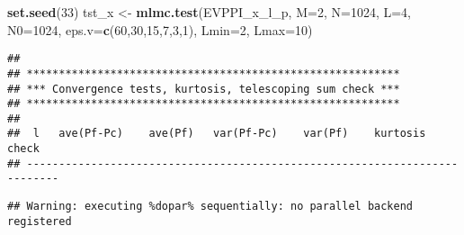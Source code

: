 \documentclass[
]{article}
\newenvironment{Shaded}{\begin{snugshade}}{\end{snugshade}}
\newcommand{\DataTypeTok}[1]{\textcolor[rgb]{0.13,0.29,0.53}{#1}}
\newcommand{\DecValTok}[1]{\textcolor[rgb]{0.00,0.00,0.81}{#1}}
\newcommand{\KeywordTok}[1]{\textcolor[rgb]{0.13,0.29,0.53}{\textbf{#1}}}
\newcommand{\NormalTok}[1]{#1}
\newcommand{\StringTok}[1]{\textcolor[rgb]{0.31,0.60,0.02}{#1}}
\begin{document}
\begin{Shaded}
\begin{Highlighting}[]
\KeywordTok{set.seed}\NormalTok{(}\DecValTok{33}\NormalTok{)}
\NormalTok{tst_x <-}\StringTok{ }\KeywordTok{mlmc.test}\NormalTok{(EVPPI_x_l_p, }\DataTypeTok{M=}\DecValTok{2}\NormalTok{, }\DataTypeTok{N=}\DecValTok{1024}\NormalTok{,}
                          \DataTypeTok{L=}\DecValTok{4}\NormalTok{, }\DataTypeTok{N0=}\DecValTok{1024}\NormalTok{,}
                          \DataTypeTok{eps.v=}\KeywordTok{c}\NormalTok{(}\DecValTok{60}\NormalTok{,}\DecValTok{30}\NormalTok{,}\DecValTok{15}\NormalTok{,}\DecValTok{7}\NormalTok{,}\DecValTok{3}\NormalTok{,}\DecValTok{1}\NormalTok{),}
                          \DataTypeTok{Lmin=}\DecValTok{2}\NormalTok{, }\DataTypeTok{Lmax=}\DecValTok{10}\NormalTok{)}
\end{Highlighting}
\end{Shaded}

\begin{verbatim}
## 
## **********************************************************
## *** Convergence tests, kurtosis, telescoping sum check ***
## **********************************************************
## 
##  l   ave(Pf-Pc)    ave(Pf)   var(Pf-Pc)    var(Pf)    kurtosis     check 
## ---------------------------------------------------------------------------
\end{verbatim}

\begin{verbatim}
## Warning: executing %dopar% sequentially: no parallel backend registered
\end{verbatim}
\end{document}

